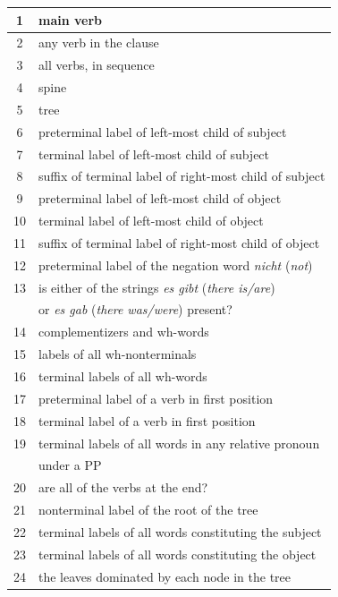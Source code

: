 \documentclass[11pt]{report}
\theoremstyle{plain}
\begin{document}
{\begin{table}[!h]
\begin{center}
\begin{small}
\begin{tabular}{|c|l|}
\hline
1 & main verb \\
\hline
2 & any verb in the clause \\
\hline
3 & all verbs, in sequence \\
\hline
4 & spine \\
\hline
5 & tree \\
\hline
6 & preterminal label  of left-most child of subject \\
\hline
7 & terminal label of left-most child of subject \\
\hline
8 & suffix of terminal label of right-most child of subject \\
\hline
9 & preterminal label  of left-most child of object \\
\hline
10 & terminal label of left-most child of object \\
\hline
11 & suffix of terminal label of right-most child of object \\
\hline
12 & preterminal label of the negation word {\em nicht} ({\em not}) \\
\hline
13 & is either of the strings {\em es gibt} ({\em there is/are})\\
& or {\em es gab} ({\em there was/were}) present? \\
\hline
14 & complementizers and wh-words \\
\hline
15 & labels of all wh-nonterminals \\
\hline
16 & terminal labels of all wh-words \\
\hline
17 & preterminal label of a verb in first position \\
\hline
18 & terminal label of a verb in first position \\
\hline
19 & terminal labels of all words in any relative pronoun\\
&  under a PP \\
\hline
20 & are all of the verbs at the end? \\
\hline
21 & nonterminal label of the root of the tree \\
\hline
22 & terminal labels of all words constituting the subject \\
\hline
23 & terminal labels of all words constituting the object \\
\hline
24 & the leaves dominated by each node in the tree \\

\end{tabular}
\end{small}
\end{center}
\end{table}}
\end{document}
